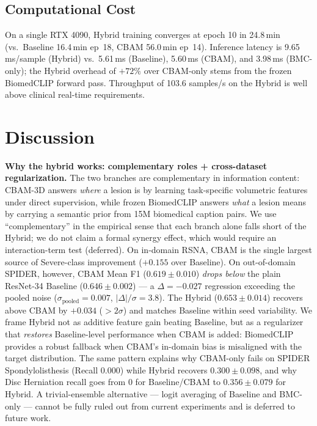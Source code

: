 \documentclass[runningheads]{llncs}
\begin{document}
\subsection{Computational Cost}

On a single RTX 4090, Hybrid training converges at epoch 10 in
24.8\,min (vs.\ Baseline 16.4\,min ep~18, CBAM 56.0\,min ep~14).
Inference latency is 9.65\,ms/sample (Hybrid) vs.\ 5.61\,ms
(Baseline), 5.60\,ms (CBAM), and 3.98\,ms (BMC-only); the Hybrid
overhead of $+72\%$ over CBAM-only stems from the frozen BiomedCLIP
forward pass. Throughput of 103.6 samples/s on the Hybrid is well
above clinical real-time requirements.

\section{Discussion}
\label{sec:disc}

\textbf{Why the hybrid works: complementary roles + cross-dataset
regularization.}
The two branches are complementary in information content:
CBAM-3D answers \emph{where} a lesion is by learning task-specific
volumetric features under direct supervision, while frozen
BiomedCLIP answers \emph{what} a lesion means by carrying a semantic
prior from 15M biomedical caption pairs. We use ``complementary''
in the empirical sense that each branch alone falls short of the
Hybrid; we do not claim a formal synergy effect, which would
require an interaction-term test (deferred). On in-domain RSNA,
CBAM is the single largest source of Severe-class improvement
($+0.155$ over Baseline). On out-of-domain SPIDER, however, CBAM
Mean F1 ($0.619 \pm 0.010$) \emph{drops below} the plain ResNet-34
Baseline ($0.646 \pm 0.002$) --- a $\Delta = -0.027$ regression
exceeding the pooled noise ($\sigma_{\text{pooled}} = 0.007$,
$|\Delta|/\sigma = 3.8$). The Hybrid ($0.653 \pm 0.014$) recovers
above CBAM by $+0.034$ ($> 2\sigma$) and matches Baseline within
seed variability. We frame Hybrid not as additive feature gain
beating Baseline, but as a regularizer that \emph{restores}
Baseline-level performance when CBAM is added: BiomedCLIP provides
a robust fallback when CBAM's in-domain bias is misaligned with
the target distribution. The same pattern explains why CBAM-only
fails on SPIDER Spondylolisthesis (Recall $0.000$) while Hybrid
recovers $0.300 \pm 0.098$, and why Disc Herniation recall goes
from $0$ for Baseline/CBAM to $0.356 \pm 0.079$ for Hybrid. A
trivial-ensemble alternative --- logit averaging of Baseline and
BMC-only --- cannot be fully ruled out from current experiments
and is deferred to future work.
\end{document}
